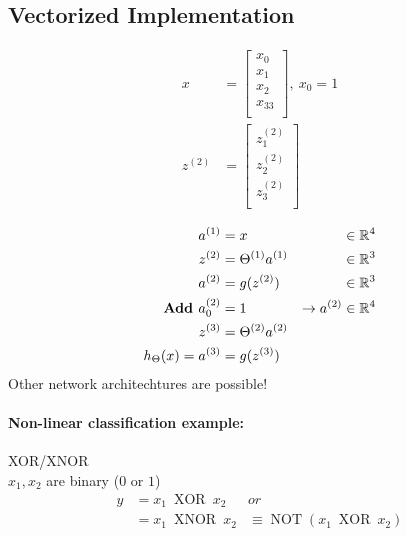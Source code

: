 \subsection*{Vectorized Implementation}
\begin{align*}
	x       & = \begin{bmatrix}
		x_0  \\
		x_1  \\
		x_2  \\
		x_33 \\
	\end{bmatrix},\ x_0 = 1 \\
	z^{(2)} & = \begin{bmatrix}
		z_1^{(2)} \\
		z_2^{(2)} \\
		z_3^{(2)} \\
	\end{bmatrix}           \\
\end{align*}
\begin{align*}
	a^{(1)}                        & = x
	                               & \in \mathbb{R}^4                     \\
	z^{(2)}                        & = \Theta^{(1)}a^{(1)}
	                               & \in \mathbb{R}^3                     \\
	a^{(2)}                        & = g(z^{(2)})
	                               & \in \mathbb{R}^3                     \\
	\text{\textbf{Add }} a_0^{(2)} & = 1
	                               & \rightarrow a^{(2)} \in \mathbb{R}^4 \\
	z^{(3)}                        & = \Theta^{(2)}a^{(2)}        \\
	h_\Theta(x) = a^{(3)}          & = g(z^{(3)})                 \\
\end{align*}
Other network architechtures are possible!

\paragraph{Non-linear classification example:} XOR/XNOR\\
$x_1, x_2$ are binary ($0$ or $1$)
\begin{align*}
	y & = x_1\ \operatorname{XOR}\ x_2                          & or \\
	  & = x_1\ \operatorname{XNOR}\ x_2
	  & \equiv \operatorname{NOT}(x_1\ \operatorname{XOR}\ x_2)      \\
\end{align*}

